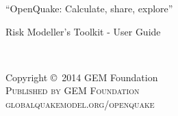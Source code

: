 %
%








\lstset{language=Python} %



\begingroup
\thispagestyle{empty}
\par\normalfont\fontsize{15}{15}\sffamily\selectfont
“OpenQuake: Calculate, share, explore”
\centering
\vspace*{9cm}
\par\normalfont\fontsize{35}{35}\sffamily\selectfont
Risk Modeller's Toolkit - User Guide\par %
\endgroup


\newpage
~\vfill
\thispagestyle{empty}

\noindent Copyright \copyright\ 2014 GEM Foundation\\ %

\noindent \textsc{Published by GEM Foundation}\\ %

\noindent \textsc{globalquakemodel.org/openquake}\\ %

